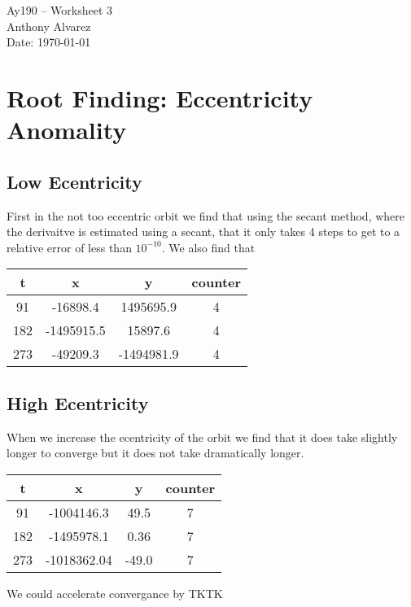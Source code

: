 \documentclass[11pt,letterpaper]{article}
\begin{document}
\begin{center}
\Large
Ay190 -- Worksheet 3\\
Anthony Alvarez\\
Date: \today
\end{center}

\section{Root Finding: Eccentricity Anomality}
\subsection{Low Ecentricity}
First in the not too eccentric orbit we find that using the secant method, 
where the derivaitve is estimated using a secant, that it only takes 4 steps
to get to a relative error of less than $10^{-10}$. We also find that 

\begin{center}
\begin{tabular}{| c | c | c | c |}
  \hline
  t & x & y & counter \\
  \hline                       
  91 & -16898.4 & 1495695.9 & 4\\
  182 & -1495915.5 &  15897.6& 4\\
  273 &  -49209.3& -1494981.9 &4 \\
  \hline  
\end{tabular}
\end{center}

\subsection{High Ecentricity}

When we increase the ecentricity of the orbit we find that it does take slightly
longer to converge but it does not take dramatically longer. 
\begin{center}
\begin{tabular}{| c | c | c | c |}
  \hline
  t & x & y & counter \\
  \hline                       
  91 & -1004146.3& 49.5 & 7\\
  182 & -1495978.1 &  0.36 & 7\\
  273 & -1018362.04 & -49.0 &7 \\
  \hline  
\end{tabular}
\end{center}

We could accelerate convergance by TKTK
\end{document}
